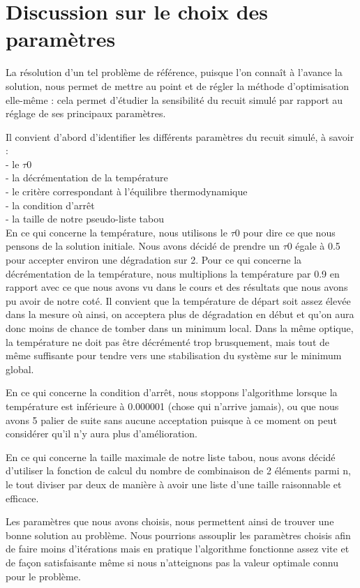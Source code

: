 \documentclass{report}
\begin{document}
\section{Discussion sur le choix des paramètres}
La résolution d'un tel problème de référence, puisque l'on connaît à l'avance la solution, nous permet de mettre au point et de régler la méthode d'optimisation elle-même : cela permet d'étudier la sensibilité du recuit simulé par rapport au réglage de ses principaux paramètres.

Il convient d'abord d'identifier les différents paramètres du recuit simulé, à savoir :\\
- le $\tau 0$\\
- la décrémentation de la température\\
- le critère correspondant à l'équilibre thermodynamique\\
- la condition d'arrêt\\
- la taille de notre pseudo-liste tabou\\

En ce qui concerne la température, nous utilisons le $\tau 0$ pour dire ce que nous pensons de la solution initiale. Nous avons décidé de prendre un $\tau 0$ égale à 0.5 pour accepter environ une dégradation sur 2. Pour ce qui concerne la décrémentation de la température, nous multiplions la température par 0.9 en rapport avec ce que nous avons vu dans le cours et des résultats que nous avons pu avoir de notre coté. Il convient que la température de départ soit assez élevée dans la mesure où ainsi, on acceptera plus de dégradation en début et qu'on aura donc moins de chance de tomber dans un minimum local. Dans la même optique, la température ne doit pas être décrémenté trop brusquement, mais tout de même suffisante pour tendre vers une stabilisation du système sur le minimum global.

En ce qui concerne la condition d'arrêt, nous stoppons l'algorithme lorsque la température est inférieure à 0.000001 (chose qui n'arrive jamais), ou que nous avons 5 palier de suite sans aucune acceptation puisque à ce moment on peut considérer qu'il n'y aura plus d'amélioration.

En ce qui concerne la taille maximale de notre liste tabou, nous avons décidé d'utiliser la fonction de calcul du nombre de combinaison de 2 éléments parmi n, le tout diviser par deux de manière à avoir une liste d'une taille raisonnable et efficace.

Les paramètres que nous avons choisis, nous permettent ainsi de trouver une bonne solution au problème. Nous pourrions assouplir les paramètres choisis afin de faire moins d'itérations mais en pratique l'algorithme fonctionne assez vite et de façon satisfaisante même si nous n'atteignons pas la valeur optimale connu pour le problème.
\end{document}
